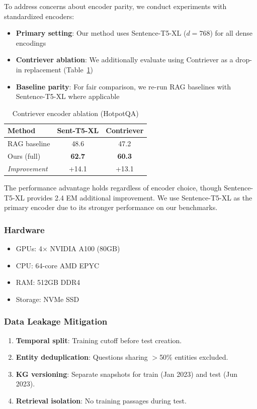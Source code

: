 \documentclass[10pt,twocolumn]{article}
\begin{document}
To address concerns about encoder parity, we conduct experiments with standardized encoders:

\begin{itemize}
    \item \textbf{Primary setting}: Our method uses Sentence-T5-XL ($d=768$) for all dense encodings
    \item \textbf{Contriever ablation}: We additionally evaluate using Contriever \cite{izacard2022contriever} as a drop-in replacement (Table~\ref{tab:contriever_ablation})
    \item \textbf{Baseline parity}: For fair comparison, we re-run RAG baselines with Sentence-T5-XL where applicable
\end{itemize}

\begin{table}[h]
\centering
\caption{Contriever encoder ablation (HotpotQA)}
\label{tab:contriever_ablation}
\small
\begin{tabular}{@{}lcc@{}}
\toprule
\textbf{Method} & \textbf{Sent-T5-XL} & \textbf{Contriever} \\
\midrule
RAG baseline & 48.6 & 47.2 \\
Ours (full) & \textbf{62.7} & \textbf{60.3} \\
\midrule
\textit{Improvement} & +14.1 & +13.1 \\
\bottomrule
\end{tabular}
\end{table}

The performance advantage holds regardless of encoder choice, though Sentence-T5-XL provides 2.4 EM additional improvement. We use Sentence-T5-XL as the primary encoder due to its stronger performance on our benchmarks.


\subsubsection{Hardware}
\begin{itemize}
    \item GPUs: 4$\times$ NVIDIA A100 (80GB)
    \item CPU: 64-core AMD EPYC
    \item RAM: 512GB DDR4
    \item Storage: NVMe SSD
\end{itemize}

\subsubsection{Data Leakage Mitigation}
\label{sec:leakage}
\begin{enumerate}
    \item \textbf{Temporal split}: Training cutoff before test creation.
    \item \textbf{Entity deduplication}: Questions sharing $>$50\% entities excluded.
    \item \textbf{KG versioning}: Separate snapshots for train (Jan 2023) and test (Jun 2023).
    \item \textbf{Retrieval isolation}: No training passages during test.
\end{enumerate}
\end{document}
